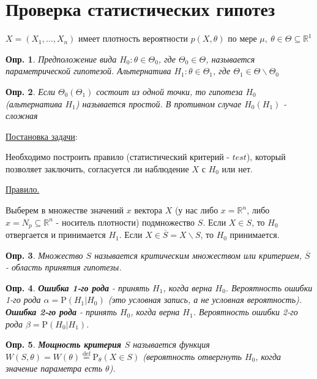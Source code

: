 \documentclass[12pt]{article}
\newtheorem{definition}{Опр.}
\theoremstyle{basic_theorem}
\theoremstyle{name_theorem}
\newcommand\defin[1]{\textbf{#1}}
\newcommand*{\defeq}{\stackrel{\text{def}}{=}}
\def\R{ \mathbb{R} }
\def\P{ \mathrm{P} }
\begin{document}
\section{Проверка статистических гипотез}
\(X = (X_1, \ldots, X_n)\) имеет плотность вероятности \(p(X, \theta)\)
по мере \(\mu,\ \theta\in\Theta\subseteq\R^1\)

\begin{definition}
    Предположение вида \(H_0: \theta\in\Theta_0\), где
    \(\Theta_0\in\Theta\), называется параметрической гипотезой.
    Альтернатива \(H_1:\theta\in\Theta_1\), где
    \(\Theta_1\in\Theta\backslash\Theta_0\)
\end{definition}

\begin{definition}
    Если \(\Theta_0(\Theta_1)\) состоит из одной точки,
    то гипотеза \(H_0\) (альтернатива \(H_1\)) называется
    простой.
    В противном случае \(H_0(H_1)\) - сложная
\end{definition}

\underline{Постановка задачи}:

Необходимо построить правило (статистический критерий - \(test\)),
который позволяет заключить, согласуется ли наблюдение \(X\)
с \(H_0\) или нет.

\underline{Правило.}

Выберем в множестве значений \(x\) вектора \(X\) (у нас либо
\(x = \R^n\), либо \(x = N_p \subseteq \R^n\) - носитель
плотности) подмножество \(S\). Если \(X \in S\), то \(H_0\) отвергается и
принимается \(H_1\). Если \(X \in \overline{S} = X \backslash S\), то
\(H_0\) принимается.

\begin{definition}
    Множество \(S\) называется критическим множеством или критерием,
    \(\overline{S}\) - область принятия гипотезы.
\end{definition}

\begin{definition}
    \defin{Ошибка 1-го рода} - принять \(H_1\), когда
    верна \(H_0\). Вероятность ошибки 1-го рода $\alpha
    = \P(H_1 | H_0)$ (это условная запись, а не условная вероятность).
    \defin{Ошибка 2-го рода} - принять \(H_0\), когда
    верна \(H_1\). Вероятность ошибки 2-го рода $\beta
    = \P(H_0 | H_1)$.
\end{definition}

\begin{definition}
    \defin{Мощность критерия \(S\)} называется функция \(W(S, \theta) = W(\theta)
    \defeq\P_\theta(X\in S)\) (вероятность отвергнуть \(H_0\), когда
    значение параметра есть \(\theta\)).
\end{definition}
\end{document}

